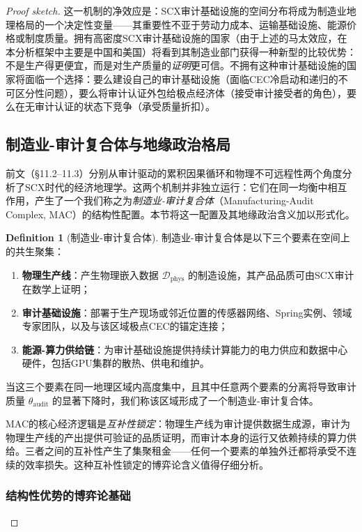 \documentclass[12pt,a4paper]{ctexart}
\theoremstyle{definition}
\newtheorem{definition}{Definition}[section]
\theoremstyle{remark}
\begin{document}
\begin{proof}[Proof sketch]
这一机制的净效应是：SCX审计基础设施的空间分布将成为制造业地理格局的一个决定性变量——其重要性不亚于劳动力成本、运输基础设施、能源价格或制度质量。拥有高密度SCX审计基础设施的国家（由于上述的马太效应，在本分析框架中主要是中国和美国）将看到其制造业部门获得一种新型的比较优势：不是生产得更便宜，而是对生产质量的\textit{证明}更可信。不拥有这种审计基础设施的国家将面临一个选择：要么建设自己的审计基础设施（面临CEC冷启动和递归的不可区分性问题），要么将审计认证外包给极点经济体（接受审计接受者的角色），要么在无审计认证的状态下竞争（承受质量折扣）。

\subsection{制造业-审计复合体与地缘政治格局}

前文（§11.2–11.3）分别从审计驱动的累积因果循环和物理不可远程性两个角度分析了SCX时代的经济地理学。这两个机制并非独立运行：它们在同一均衡中相互作用，产生了一个我们称之为\textit{制造业-审计复合体}（Manufacturing-Audit Complex, MAC）的结构性配置。本节将这一配置及其地缘政治含义加以形式化。

\begin{definition}[制造业-审计复合体]
制造业-审计复合体是以下三个要素在空间上的共生聚集：
\begin{enumerate}[label=(\roman*)]
    \item \textbf{物理生产线}：产生物理嵌入数据 $\mathcal{D}_{\text{phys}}$ 的制造设施，其产品品质可由SCX审计在数学上证明；
    \item \textbf{审计基础设施}：部署于生产现场或邻近位置的传感器网络、Spring实例、领域专家团队，以及与该区域极点CEC的锚定连接；
    \item \textbf{能源-算力供给链}：为审计基础设施提供持续计算能力的电力供应和数据中心硬件，包括GPU集群的散热、供电和维护。
\end{enumerate}
当这三个要素在同一地理区域内高度集中，且其中任意两个要素的分离将导致审计质量 $\theta_{\text{audit}}$ 的显著下降时，我们称该区域形成了一个制造业-审计复合体。
\end{definition}

MAC的核心经济逻辑是\textit{互补性锁定}：物理生产线为审计提供数据生成源，审计为物理生产线的产出提供可验证的品质证明，而审计本身的运行又依赖持续的算力供给。三者之间的互补性产生了集聚租金——任何一个要素的单独外迁都将承受不连续的效率损失。这种互补性锁定的博弈论含义值得仔细分析。

\subsubsection*{结构性优势的博弈论基础}


\end{proof}
\end{document}
